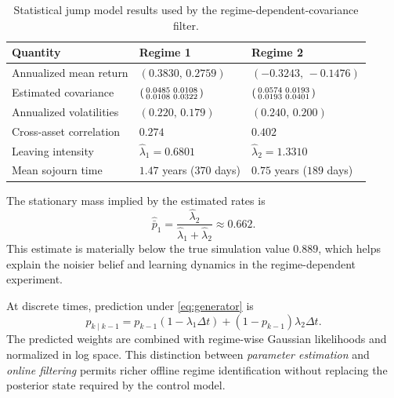 \documentclass[a4paper,10pt]{article}
\begin{document}
\begin{table}[H]
\centering
\small
\caption{Statistical jump model results used by the regime-dependent-covariance filter.}
\label{tab:sjm_results}
\begin{tabular}{>{\raggedright\arraybackslash}p{} >{\raggedright\arraybackslash}p{} >{\raggedright\arraybackslash}p{}}
\toprule
Quantity & Regime 1 & Regime 2 \\
\midrule
Annualized mean return & $(0.3830,\,0.2759)$ & $(-0.3243,\,-0.1476)$ \\
Estimated covariance & $\begin{psmallmatrix}0.0485&0.0108\\0.0108&0.0322\end{psmallmatrix}$ & $\begin{psmallmatrix}0.0574&0.0193\\0.0193&0.0401\end{psmallmatrix}$ \\
Annualized volatilities & $(0.220,\,0.179)$ & $(0.240,\,0.200)$ \\
Cross-asset correlation & $0.274$ & $0.402$ \\
Leaving intensity & $\widehat\lambda_1=0.6801$ & $\widehat\lambda_2=1.3310$ \\
Mean sojourn time & $1.47$ years ($370$ days) & $0.75$ years ($189$ days) \\
\bottomrule
\end{tabular}
\end{table}

The stationary mass implied by the estimated rates is
\begin{equation}
\widehat{\bar p}_1=\frac{\widehat\lambda_2}{\widehat\lambda_1+\widehat\lambda_2}\approx0.662.
\end{equation}
This estimate is materially below the true simulation value $0.889$, which helps explain the noisier belief and learning dynamics in the regime-dependent experiment.

At discrete times, prediction under \eqref{eq:generator} is
\begin{equation}
p_{k\mid k-1}
=p_{k-1}(1-\lambda_1\Delta t)
+(1-p_{k-1})\lambda_2\Delta t.
\end{equation}
The predicted weights are combined with regime-wise Gaussian likelihoods and normalized in log space. This distinction between \emph{parameter estimation} and \emph{online filtering} permits richer offline regime identification without replacing the posterior state required by the control model.
\end{document}

